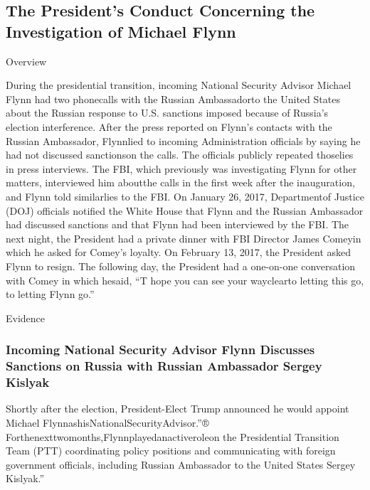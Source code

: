 \subsection{The President's Conduct Concerning the Investigation of Michael Flynn}

Overview

During the presidential transition, incoming National Security Advisor Michael Flynn had two phonecalls with the Russian Ambassadorto the United States about the Russian response to U.S. sanctions imposed because of Russia’s election interference. After the press reported on Flynn’s contacts with the Russian Ambassador, Flynnlied to incoming Administration officials by saying he had not discussed sanctionson the calls. The officials publicly repeated thoselies in press interviews. The FBI, which previously was investigating Flynn for other matters, interviewed him aboutthe calls in the first week after the inauguration, and Flynn told similarlies to the FBI. On January 26, 2017, Departmentof Justice (DOJ) officials notified the White House that Flynn and the Russian Ambassador had discussed sanctions and that Flynn had been
interviewed by the FBI. The next night, the President had a private dinner with FBI Director James Comeyin which he asked for Comey’s loyalty. On February 13, 2017, the President asked Flynn to resign. The following day, the President had a one-on-one conversation with Comey in which hesaid, “T hope you can see your wayclearto letting this go, to letting Flynn go.”

Evidence

\subsubsection{Incoming National Security Advisor Flynn Discusses Sanctions on Russia with Russian Ambassador Sergey Kislyak}

Shortly after the election, President-Elect Trump announced he would appoint Michael FlynnashisNationalSecurityAdvisor.”® Forthenexttwomonths,Flynnplayedanactiveroleon the Presidential Transition Team (PTT) coordinating policy positions and communicating with foreign government officials, including Russian Ambassador to the United States Sergey Kislyak.”

